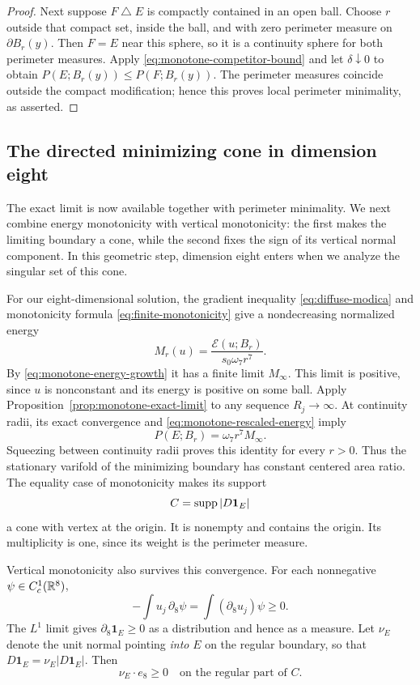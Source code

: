\begin{proof}
Next suppose $F\mathbin\triangle E$ is compactly contained in an
open ball.  Choose $r$ outside that compact set, inside the ball, and
with zero perimeter measure on $\partial B_r(y)$.  Then $F=E$ near
this sphere, so it is a continuity sphere for both perimeter measures.
Apply \eqref{eq:monotone-competitor-bound} and let $\delta\downarrow0$
to obtain $P(E;B_r(y))\le P(F;B_r(y))$.  The perimeter measures
coincide outside the compact modification; hence this proves local
perimeter minimality, as asserted.
\end{proof}

\subsection{The directed minimizing cone in dimension eight}

The exact limit is now available together with perimeter minimality.
We next combine energy monotonicity with vertical monotonicity: the first
makes the limiting boundary a cone, while the second fixes the sign of
its vertical normal component.  In this geometric step, dimension eight
enters when we analyze the singular set of this cone.

For our eight-dimensional solution, the gradient inequality
\eqref{eq:diffuse-modica} and monotonicity formula
\eqref{eq:finite-monotonicity} give a nondecreasing normalized energy
\[
 M_r(u)=\frac{\mathcal E(u;B_r)}{s_0\omega_7r^7}.
\]
By \eqref{eq:monotone-energy-growth} it has a finite limit
$M_\infty$.  This limit is positive, since $u$ is nonconstant and its
energy is positive on some ball.  Apply
Proposition~\ref{prop:monotone-exact-limit} to any sequence
$R_j\to\infty$.  At continuity radii, its exact convergence and
\eqref{eq:monotone-rescaled-energy} imply
\begin{equation}
 P(E;B_r)=\omega_7r^7M_\infty.
 \label{eq:monotone-cone-ratios}
\end{equation}
Squeezing between continuity radii proves this identity for every $r>0$.
Thus the stationary varifold of the minimizing boundary has constant
centered area ratio.  The equality case of monotonicity makes its support
\[
 C=\operatorname{supp}|D\mathbf1_E|
\]
a cone with vertex at the origin.  It is nonempty and contains the origin.
Its multiplicity is one, since its weight is the perimeter measure.

Vertical monotonicity also survives this convergence.  For each
nonnegative $\psi\in C_c^1(\mathbb R^8)$,
\[
 -\int u_j\,\partial_8\psi=\int (\partial_8u_j)\psi\ge0.
\]
The $L^1$ limit gives $\partial_8\mathbf1_E\ge0$ as a distribution
and hence as a measure.  Let $\nu_E$ denote the unit normal pointing
\emph{into} $E$ on the regular boundary, so that
$D\mathbf1_E=\nu_E|D\mathbf1_E|$.  Then
\begin{equation}
 \nu_E\cdot e_8\ge0\quad\text{on the regular part of }C.
 \label{eq:monotone-directed-cone}
\end{equation}

